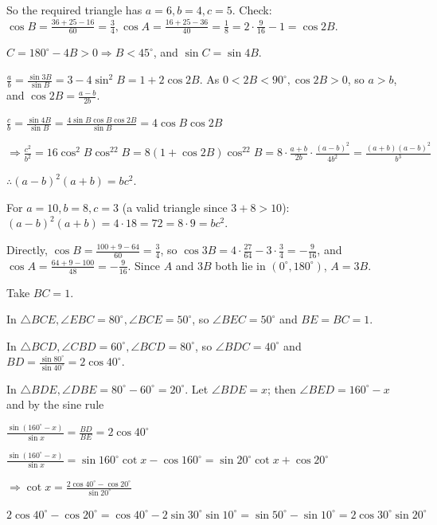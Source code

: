   So the required triangle has $a = 6, b = 4, c = 5$. Check: $\cos B = \frac{36 + 25 - 16}{60} = \frac{3}{4},
  \cos A = \frac{16 + 25 - 36}{40} = \frac{1}{8} = 2\cdot\frac{9}{16} - 1 = \cos2B$.
\item $C = 180^\circ - 4B > 0\Rightarrow B < 45^\circ$, and $\sin C = \sin4B$.

  $\frac{a}{b} = \frac{\sin3B}{\sin B} = 3 - 4\sin^2B = 1 + 2\cos2B$. As $0 < 2B < 90^\circ, \cos2B > 0$, so $a
  > b$, and $\cos2B = \frac{a - b}{2b}$.

  $\frac{c}{b} = \frac{\sin4B}{\sin B} = \frac{4\sin B\cos B\cos2B}{\sin B} = 4\cos B\cos2B$

  $\Rightarrow \frac{c^2}{b^2} = 16\cos^2B\cos^22B = 8(1 + \cos2B)\cos^22B = 8\cdot\frac{a + b}{2b}\cdot\frac{(a
  - b)^2}{4b^2} = \frac{(a + b)(a - b)^2}{b^3}$

  $\therefore (a - b)^2(a + b) = bc^2$.

  For $a = 10, b = 8, c = 3$ (a valid triangle since $3 + 8 > 10$): $(a - b)^2(a + b) = 4\cdot18 = 72 = 8\cdot9 =
  bc^2$.

  Directly, $\cos B = \frac{100 + 9 - 64}{60} = \frac{3}{4}$, so $\cos3B = 4\cdot\frac{27}{64} - 3\cdot\frac{3}{4}
  = -\frac{9}{16}$, and $\cos A = \frac{64 + 9 - 100}{48} = -\frac{9}{16}$. Since $A$ and $3B$ both lie in
  $(0^\circ, 180^\circ)$, $A = 3B$.
\item Take $BC = 1$.

  In $\triangle BCE, \angle EBC = 80^\circ, \angle BCE = 50^\circ$, so $\angle BEC = 50^\circ$ and $BE = BC =
  1$.

  In $\triangle BCD, \angle CBD = 60^\circ, \angle BCD = 80^\circ$, so $\angle BDC = 40^\circ$ and $BD =
  \frac{\sin80^\circ}{\sin40^\circ} = 2\cos40^\circ$.

  In $\triangle BDE, \angle DBE = 80^\circ - 60^\circ = 20^\circ$. Let $\angle BDE = x$; then $\angle BED =
  160^\circ - x$ and by the sine rule

  $\frac{\sin(160^\circ - x)}{\sin x} = \frac{BD}{BE} = 2\cos40^\circ$

  $\frac{\sin(160^\circ - x)}{\sin x} = \sin160^\circ\cot x - \cos160^\circ = \sin20^\circ\cot x +
  \cos20^\circ$

  $\Rightarrow \cot x = \frac{2\cos40^\circ - \cos20^\circ}{\sin20^\circ}$

  $2\cos40^\circ - \cos20^\circ = \cos40^\circ - 2\sin30^\circ\sin10^\circ = \sin50^\circ - \sin10^\circ =
  2\cos30^\circ\sin20^\circ$

